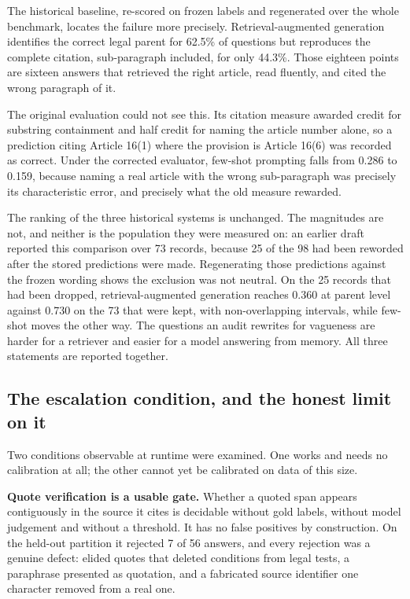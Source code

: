 The historical baseline, re-scored on frozen labels and regenerated over the
whole benchmark, locates the failure more precisely. Retrieval-augmented
generation identifies the correct legal parent for 62.5\% of questions but
reproduces the complete citation, sub-paragraph included, for only 44.3\%. Those
eighteen points are sixteen answers that retrieved the right article, read
fluently, and cited the wrong paragraph of it.

The original evaluation could not see this. Its citation measure awarded credit
for substring containment and half credit for naming the article number alone, so
a prediction citing Article 16(1) where the provision is Article 16(6) was
recorded as correct. Under the corrected evaluator, few-shot prompting falls from
0.286 to 0.159, because naming a real article with the wrong sub-paragraph was
precisely its characteristic error, and precisely what the old measure rewarded.

The ranking of the three historical systems is unchanged. The magnitudes are
not, and neither is the population they were measured on: an earlier draft
reported this comparison over 73 records, because 25 of the 98 had been reworded
after the stored predictions were made. Regenerating those predictions against the
frozen wording shows the exclusion was not neutral. On the 25 records that had
been dropped, retrieval-augmented generation reaches 0.360 at parent level against
0.730 on the 73 that were kept, with non-overlapping intervals, while few-shot
moves the other way. The questions an audit rewrites for vagueness are harder for
a retriever and easier for a model answering from memory. All three statements are
reported together.

\subsection{The escalation condition, and the honest limit on it}

Two conditions observable at runtime were examined. One works and needs no
calibration at all; the other cannot yet be calibrated on data of this size.

\textbf{Quote verification is a usable gate.} Whether a quoted span appears
contiguously in the source it cites is decidable without gold labels, without
model judgement and without a threshold. It has no false positives by
construction. On the held-out partition it rejected 7 of 56 answers, and every
rejection was a genuine defect: elided quotes that deleted conditions from legal
tests, a paraphrase presented as quotation, and a fabricated source identifier one
character removed from a real one.

